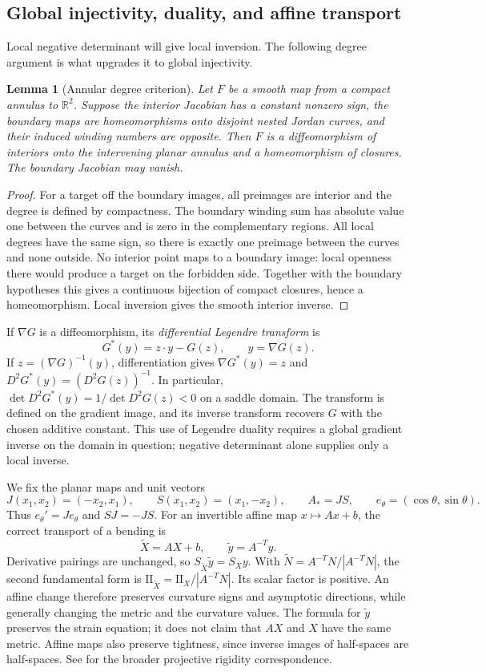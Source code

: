 \documentclass[11pt]{amsart}
\newtheorem{lemma}[theorem]{Lemma}
\theoremstyle{definition}
\theoremstyle{remark}
\newcommand{\R}{\mathbb R}\newcommand{\Sph}{\mathbb S}
\newcommand{\II}{\mathrm{II}}\newcommand{\Gmap}{\mathcal G}
\numberwithin{equation}{section}
\begin{document}
\subsection{Global injectivity, duality, and affine transport}
Local negative determinant will give local inversion. The following
degree argument is what upgrades it to global injectivity.
\begin{lemma}[Annular degree criterion]\label{lem:degree}
Let $F$ be a smooth map from a compact annulus to $\R^2$. Suppose the
interior Jacobian has a constant nonzero sign, the boundary maps are
homeomorphisms onto disjoint nested Jordan curves, and their induced
winding numbers are opposite. Then $F$ is a diffeomorphism of interiors
onto the intervening planar annulus and a homeomorphism of closures.
The boundary Jacobian may vanish.
\end{lemma}
\begin{proof}
For a target off the boundary images, all preimages are interior and the
degree is defined by compactness. The boundary winding sum has absolute
value one between the curves and is zero in the complementary regions.
All local degrees have the same sign, so there is exactly one preimage
between the curves and none outside. No interior point maps to a boundary
image: local openness there would produce a target on the forbidden side.
Together with the boundary hypotheses this gives a continuous bijection
of compact closures, hence a homeomorphism. Local inversion gives the
smooth interior inverse.
\end{proof}

If $\nabla G$ is a diffeomorphism, its \emph{differential Legendre transform}
is
\[
 G^*(y)=z\cdot y-G(z),\qquad y=\nabla G(z).
\]
If $z=(\nabla G)^{-1}(y)$, differentiation gives
$\nabla G^*(y)=z$ and $D^2G^*(y)=(D^2G(z))^{-1}$.
In particular, $\det D^2G^*(y)=1/\det D^2G(z)<0$ on a saddle domain.
The transform is defined on the gradient image, and its inverse
transform recovers $G$ with the chosen additive constant. This use of
Legendre duality requires a global gradient inverse on the domain in
question; negative determinant alone supplies only a local inverse.

We fix the planar maps and unit vectors
\[
 J(x_1,x_2)=(-x_2,x_1),\qquad S(x_1,x_2)=(x_1,-x_2),
 \qquad A_*=JS,\qquad e_\theta=(\cos\theta,\sin\theta).
\]
Thus $e_\theta'=Je_\theta$ and $SJ=-JS$.
For an invertible affine map $x\mapsto Ax+b$, the correct transport of
a bending is
\begin{equation}\label{eq:affine-transport}
 \widetilde X=AX+b,\qquad \widetilde y=A^{-T}y.
\end{equation}
Derivative pairings are unchanged, so $S_{\widetilde X}\widetilde y=S_Xy$.
With $\widetilde N=A^{-T}N/|A^{-T}N|$, the second fundamental form is
$\II_{\widetilde X}=\II_X/|A^{-T}N|$. Its scalar factor is positive.
An affine change therefore preserves curvature signs and asymptotic
directions, while generally changing the metric and the curvature values.
The formula for $\widetilde y$ preserves the strain equation; it does
not claim that $AX$ and $X$ have the same metric. Affine maps also preserve
tightness, since inverse images of half-spaces are half-spaces.
See \cite{IzmProj} for the broader projective rigidity correspondence.
\end{document}
